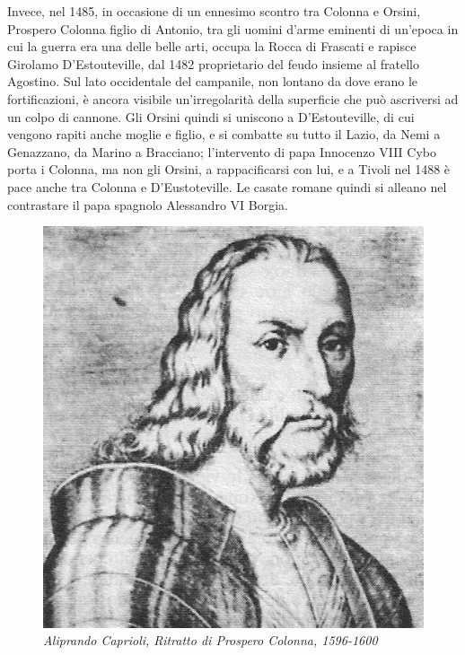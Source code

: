 \documentclass[
  letterpaper,
  DIV=11,
  numbers=noendperiod]{scrartcl}
\begin{document}
Invece, nel 1485, in occasione di un ennesimo scontro tra Colonna e
Orsini, Prospero Colonna figlio di Antonio, tra gli uomini d'arme
eminenti di un'epoca in cui la guerra era una delle belle arti, occupa
la Rocca di Frascati e rapisce Girolamo D'Estouteville, dal 1482
proprietario del feudo insieme al fratello Agostino. Sul lato
occidentale del campanile, non lontano da dove erano le fortificazioni,
è ancora visibile un'irregolarità della superficie che può ascriversi ad
un colpo di cannone. Gli Orsini quindi si uniscono a D'Estouteville, di
cui vengono rapiti anche moglie e figlio, e si combatte su tutto il
Lazio, da Nemi a Genazzano, da Marino a Bracciano; l'intervento di papa
Innocenzo VIII Cybo porta i Colonna, ma non gli Orsini, a rappacificarsi
con lui, e a Tivoli nel 1488 è pace anche tra Colonna e D'Eustoteville.
Le casate romane quindi si alleano nel contrastare il papa spagnolo
Alessandro VI Borgia.

\begin{figure}

{\centering \includegraphics{../../images/2024/san_rocco/Prospero_Colonna.jpg}

}

\caption{\emph{Aliprando Caprioli, Ritratto di Prospero Colonna,
1596-1600}}

\end{figure}
\end{document}
